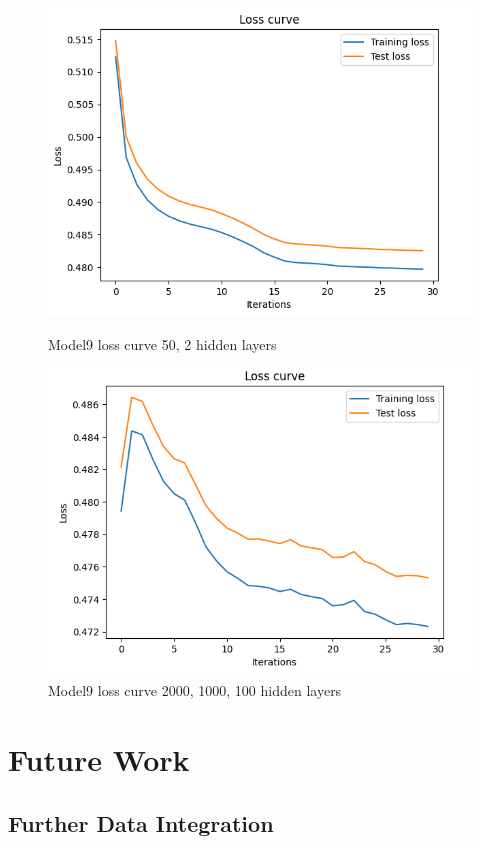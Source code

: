 \begin{figure}[!htb]
    \centering
    \includegraphics[scale=0.6]{figures/m9_loss_curve.png} 
    \caption{Model9 loss curve 50, 2 hidden layers}
    \label{fig:x lc_m9}
    
    \centering
    \includegraphics[scale=0.6]{figures/big_nn_loss_curve.png} 
    \caption{Model9 loss curve 2000, 1000, 100 hidden layers}
    \label{fig:x lc_big_m9}
\end{figure}

\section{Future Work}

\subsection{Further Data Integration}

